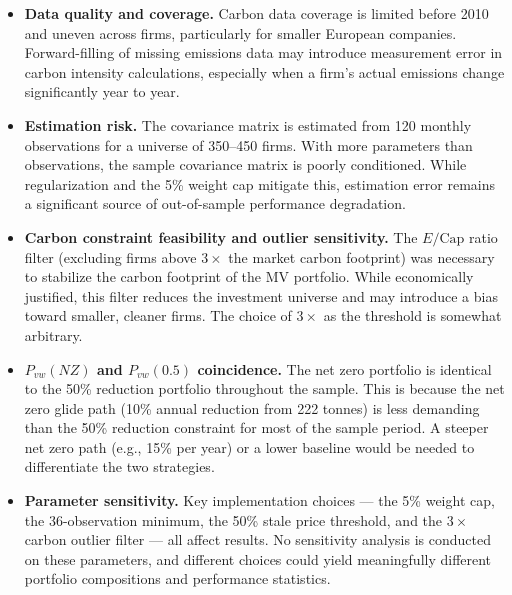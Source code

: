 \documentclass[12pt, a4paper]{article}
\begin{document}
\begin{itemize}
    \item \textbf{Data quality and coverage.} Carbon data coverage is limited 
    before 2010 and uneven across firms, particularly for smaller European 
    companies. Forward-filling of missing emissions data may introduce 
    measurement error in carbon intensity calculations, especially when a 
    firm's actual emissions change significantly year to year.

    \item \textbf{Estimation risk.} The covariance matrix is estimated from 
    120 monthly observations for a universe of 350--450 firms. With more 
    parameters than observations, the sample covariance matrix is poorly 
    conditioned. While regularization and the 5\% weight cap mitigate this, 
    estimation error remains a significant source of out-of-sample performance 
    degradation.

    \item \textbf{Carbon constraint feasibility and outlier sensitivity.} The 
    $E/\text{Cap}$ ratio filter (excluding firms above $3\times$ the market 
    carbon footprint) was necessary to stabilize the carbon footprint of the 
    MV portfolio. While economically justified, this filter reduces the 
    investment universe and may introduce a bias toward smaller, cleaner firms. 
    The choice of $3\times$ as the threshold is somewhat arbitrary.

    \item \textbf{$P_{vw}(NZ)$ and $P_{vw}(0.5)$ coincidence.} The net zero 
    portfolio is identical to the 50\% reduction portfolio throughout the 
    sample. This is because the net zero glide path (10\% annual reduction 
    from 222 tonnes) is less demanding than the 50\% reduction constraint for 
    most of the sample period. A steeper net zero path (e.g., 15\% per year) 
    or a lower baseline would be needed to differentiate the two strategies.

    \item \textbf{Parameter sensitivity.} Key implementation choices --- the 
    5\% weight cap, the 36-observation minimum, the 50\% stale price threshold, 
    and the $3\times$ carbon outlier filter --- all affect results. No 
    sensitivity analysis is conducted on these parameters, and different choices 
    could yield meaningfully different portfolio compositions and performance 
    statistics.
\end{itemize}
\end{document}

